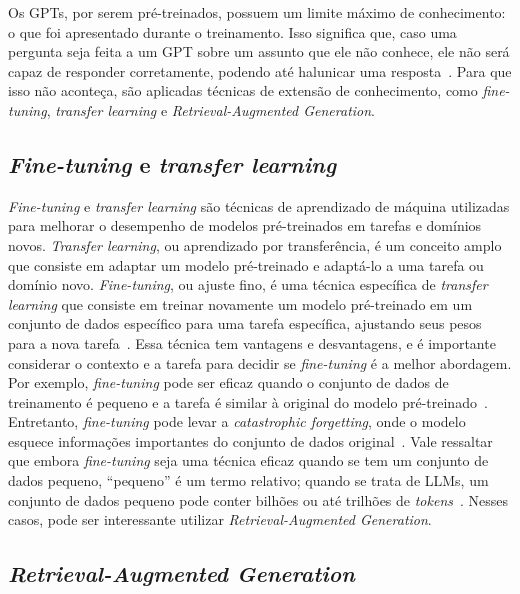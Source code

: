 \documentclass[journal]{IEEEtran}
\begin{document}
Os GPTs, por serem pré-treinados, possuem um limite máximo de conhecimento: o que foi apresentado durante o treinamento.
Isso significa que, caso uma pergunta seja feita a um GPT sobre um assunto que ele não conhece, ele não será capaz de responder corretamente, podendo até halunicar uma resposta~\cite{ji2023survey}.
Para que isso não aconteça, são aplicadas técnicas de extensão de conhecimento, como \textit{fine-tuning}, \textit{transfer learning} e \textit{Retrieval-Augmented Generation}.

\subsection{\textit{Fine-tuning} e \textit{transfer learning}}

\noindent%
\textit{Fine-tuning} e \textit{transfer learning} são técnicas de aprendizado de máquina utilizadas para melhorar o desempenho de modelos pré-treinados em tarefas e domínios novos.
\textit{Transfer learning}, ou aprendizado por transferência, é um conceito amplo que consiste em adaptar um modelo pré-treinado e adaptá-lo a uma tarefa ou domínio novo.
\textit{Fine-tuning}, ou ajuste fino, é uma técnica específica de \textit{transfer learning} que consiste em treinar novamente um modelo pré-treinado em um conjunto de dados específico para uma tarefa específica, ajustando seus pesos para a nova tarefa~\cite{vaswani2017attention,devlin2018bert}.
Essa técnica tem vantagens e desvantagens, e é importante considerar o contexto e a tarefa para decidir se \textit{fine-tuning} é a melhor abordagem.
Por exemplo, \textit{fine-tuning} pode ser eficaz quando o conjunto de dados de treinamento é pequeno e a tarefa é similar à original do modelo pré-treinado~\cite{devlin2018bert}.
Entretanto, \textit{fine-tuning} pode levar a \textit{catastrophic forgetting}, onde o modelo esquece informações importantes do conjunto de dados original~\cite{xu2020forget}.
Vale ressaltar que embora \textit{fine-tuning} seja uma técnica eficaz quando se tem um conjunto de dados pequeno, ``pequeno'' é um termo relativo; quando se trata de LLMs, um conjunto de dados pequeno pode conter bilhões ou até trilhões de \textit{tokens}~\cite{touvron2023llama2,devlin2018bert,meta2024llama3}.
Nesses casos, pode ser interessante utilizar \textit{Retrieval-Augmented Generation}.

\subsection{\textit{Retrieval-Augmented Generation}}
\end{document}
